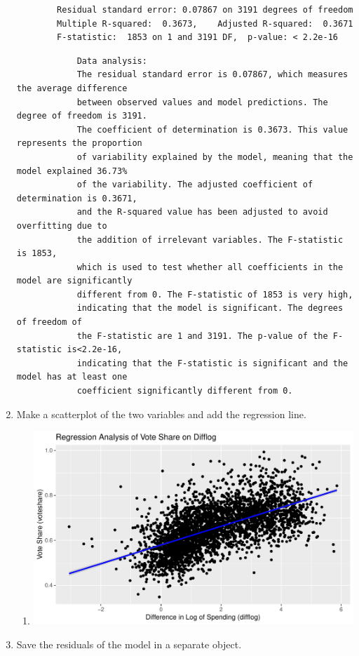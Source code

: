 \documentclass[12pt,letterpaper]{article}
\begin{document}
\begin{enumerate}
\begin{verbatim}
		Residual standard error: 0.07867 on 3191 degrees of freedom
		Multiple R-squared:  0.3673,	Adjusted R-squared:  0.3671 
		F-statistic:  1853 on 1 and 3191 DF,  p-value: < 2.2e-16
		\end{verbatim}
		\begin{verbatim}
			Data analysis:
			The residual standard error is 0.07867, which measures the average difference 
			between observed values and model predictions. The degree of freedom is 3191. 
			The coefficient of determination is 0.3673. This value represents the proportion 
			of variability explained by the model, meaning that the model explained 36.73% 
			of the variability. The adjusted coefficient of determination is 0.3671, 
			and the R-squared value has been adjusted to avoid overfitting due to 
			the addition of irrelevant variables. The F-statistic is 1853, 
			which is used to test whether all coefficients in the model are significantly 
			different from 0. The F-statistic of 1853 is very high, 
			indicating that the model is significant. The degrees of freedom of 
			the F-statistic are 1 and 3191. The p-value of the F-statistic is<2.2e-16, 
			indicating that the F-statistic is significant and the model has at least one 
			coefficient significantly different from 0.
		\end{verbatim}
		\vspace{0.005cm}
		\item Make a scatterplot of the two variables and add the regression line. 	
		
		\begin{enumerate}
			\item[]
			\includegraphics[width=.70\textwidth]{my_answers_question1.1_plot.pdf}
		\end{enumerate}
		\vspace{0cm}
		\item Save the residuals of the model in a separate object.
		

\end{enumerate}
\end{document}
